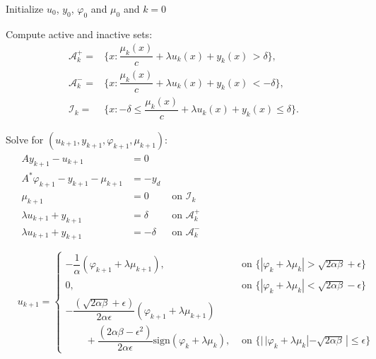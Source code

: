 \documentclass[11pt,a4paper]{amsart}
\newcommand{\sign}{\mathrm{sign}}
\begin{document}
\begin{algorithm}[H]
\caption{ Primal-Dual Active Set Algorithm with regularization} 
\begin{algorithmic}[1]
\item Initialize  $u_0$, $y_0$, $\varphi_0$ and $\mu_0$  and $k=0$

\item Compute active and inactive sets:
       \begin{align*}
       	 \mathcal{A}^+_{k} = & \{x: \dfrac{\mu_{k}(x)}{c}+\lambda u_{k}(x) + y_{k}(x)  \, > \delta \}, \\
       	 \mathcal{A}^-_{k} = & \{x: \dfrac{\mu_{k}(x)}{c}+\lambda u_{k}(x) + y_{k}(x)  \, < -\delta \}, \\
       	 \mathcal{I}_{k} = & \{x: -\delta \leq \dfrac{\mu_{k}(x)}{c} + \lambda u_{k}(x) + y_{k}(x)\leq \delta  \}. 
       \end{align*}
\item Solve for $(u_{k+1}, y_{k+1}, \varphi_{k+1}, \mu_{k+1}):  $ 
\begin{align*}
   & \begin{array}{rll}
    A y_{k+1} - u_{k+1} &= 0 \\
    A^* \varphi_{k+1} - y_{k+1} -\mu_{k+1} &= -y_d \\
    \mu_{k+1} &=0 &\text{ on } \mathcal{I}_k \\
    \lambda u_{k+1} + y_{k+1} &=\delta & \text{ on } \mathcal{A}^+_k \\ 
    \lambda u_{k+1} + y_{k+1} &=-\delta& \text{ on } \mathcal{A}^-_k \\
    \end{array} \\
% 
&u_{k+1} = 
\begin{cases}
-\dfrac{1}{\alpha} (\varphi_{k+1}+ \lambda\mu_{k+1}), & \text{ on } \{ |\varphi_k + \lambda\mu_k|>\sqrt{2\alpha\beta} +\epsilon\}\\
0, &  \text{ on } \{ |\varphi_k + \lambda\mu_k|<\sqrt{2\alpha\beta} -\epsilon\} \\
-\dfrac{(\sqrt{2\alpha\beta}+\epsilon)}{2\alpha\epsilon} (\varphi_{k+1}+\lambda\mu_{k+1} ) \\
\qquad+ \dfrac{({2\alpha\beta}-\epsilon^2)}{2\alpha\epsilon} \sign(\varphi_k+\lambda\mu_{k}),& \text{ on } \{ |\, |\varphi_k + \lambda\mu_k|-\sqrt{2\alpha\beta}\,|\leq \epsilon\}
\end{cases}
\end{align*}

\end{algorithmic}\label{al:sqh}
\end{algorithm}
\end{document}
